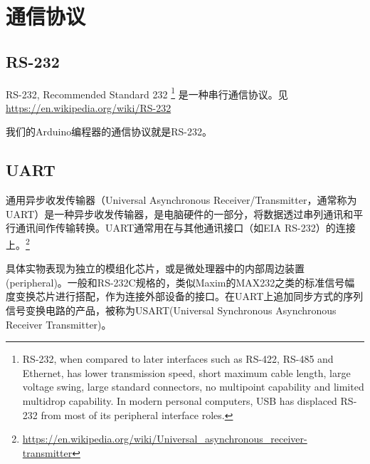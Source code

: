 \chapter{通信协议}
\label{cha:Communication}

\section{RS-232}

RS-232, Recommended Standard 232 \footnote{RS-232, when compared to later interfaces such as RS-422, RS-485 and Ethernet, has lower transmission speed, short maximum cable length, large voltage swing, large standard connectors, no multipoint capability and limited multidrop capability. In modern personal computers, USB has displaced RS-232 from most of its peripheral interface roles.} 是一种串行通信协议。见\url{https://en.wikipedia.org/wiki/RS-232}

我们的Arduino编程器的通信协议就是RS-232。

\section{UART}

通用异步收发传输器（Universal Asynchronous Receiver/Transmitter，通常称为UART）是一种异步收发传输器，是电脑硬件的一部分，将数据透过串列通讯和平行通讯间作传输转换。UART通常用在与其他通讯接口（如EIA RS-232）的连接上。\footnote{\url{https://en.wikipedia.org/wiki/Universal_asynchronous_receiver-transmitter}}

具体实物表现为独立的模组化芯片，或是微处理器中的内部周边装置(peripheral)。一般和RS-232C规格的，类似Maxim的MAX232之类的标准信号幅度变换芯片进行搭配，作为连接外部设备的接口。在UART上追加同步方式的序列信号变换电路的产品，被称为USART(Universal Synchronous Asynchronous Receiver Transmitter)。